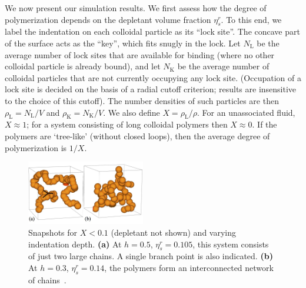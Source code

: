 \documentclass[8.5pt,oneside,onecolumn]{article}
\newcommand{\NL}{N_\mathrm{L}}
\newcommand{\NK}{N_\mathrm{K}}
\newcommand{\rhoL}{\rho_\mathrm{L}}
\newcommand{\rhoK}{\rho_\mathrm{K}}
\newcommand{\figurewidth}{0.46\textwidth}
\begin{document}
We now present our simulation results. We first assess how the degree of
polymerization depends on the depletant volume fraction $\eta_s^r$.
To this end, we label the indentation on each colloidal particle as
its ``lock site''. The concave part of the surface acts as the
``key'', which fits snugly in the lock.  Let $\NL$ be the average number of
lock sites that are available for binding (where no other colloidal
particle is already bound), and let $\NK$ be the average number of colloidal
particles that are not currently occupying any lock site.
(Occupation
of a lock site is decided on the basis of a radial cutoff criterion;
results are insensitive to the choice of this cutoff).
The 
number densities of such particles are then
$\rhoL=\NL/V$ and $\rhoK=\NK/V$.
We also define
$X=\rhoL/\rho$.  For an unassociated fluid, $X\approx 1$; for a system
consisting of long colloidal polymers then $X\approx 0$.  If the
polymers are `tree-like' (without closed loops), then the average
degree of polymerization is $1/X$.


\begin{figure} 
  \includegraphics[width=\figurewidth]{Fig4.jpg}

\caption{Snapshots for $X<0.1$ (depletant not shown) and varying
    indentation depth. {\bf (a)} At $h=0.5$, $\eta_s^r=0.105$, this
    system consists of just two large chains. A single branch point is
    also indicated. {\bf (b)} At
    $h=0.3$, $\eta_s^r=0.14$, the polymers form an
    interconnected network of chains~\cite{Bianchi06}.}
  \label{fig:other-snaps}

\end{figure}
\end{document}
